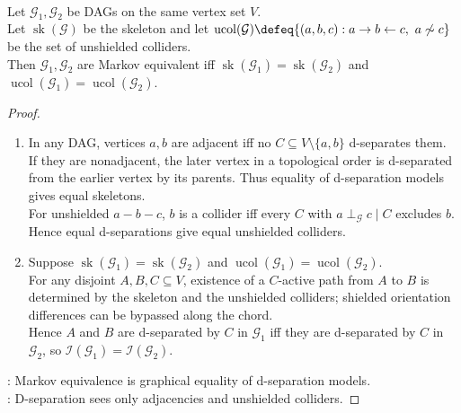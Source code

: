 \begin{theorem} \label{thm:markov-equivalence-skeleton-colliders} \\
Let $\mathcal{G}_1,\mathcal{G}_2$ be DAGs on the same vertex set $V$.\\
Let $\operatorname{sk}(\mathcal{G})$ be the skeleton and let $\operatorname{ucol}(\mathcal{G})\defeq\{(a,b,c):a\to b\leftarrow c,\ a\not\sim c\}$ be the set of unshielded colliders.\\
Then $\mathcal{G}_1,\mathcal{G}_2$ are Markov equivalent iff $\operatorname{sk}(\mathcal{G}_1)=\operatorname{sk}(\mathcal{G}_2)$ and $\operatorname{ucol}(\mathcal{G}_1)=\operatorname{ucol}(\mathcal{G}_2)$.
\begin{proof}
\begin{enumerate}[label=\roman*.]
\setlength{\itemsep}{0pt}
\item[$(\Rightarrow)$] In any DAG, vertices $a,b$ are adjacent iff no $C\subseteq V\setminus\{a,b\}$ d-separates them.\\
If they are nonadjacent, the later vertex in a topological order is d-separated from the earlier vertex by its parents. Thus equality of d-separation models gives equal skeletons.\\
For unshielded $a-b-c$, $b$ is a collider iff every $C$ with $a\perp_{\mathcal{G}}c\mid C$ excludes $b$.\\
Hence equal d-separations give equal unshielded colliders.
\item[$(\Leftarrow)$] Suppose $\operatorname{sk}(\mathcal{G}_1)=\operatorname{sk}(\mathcal{G}_2)$ and $\operatorname{ucol}(\mathcal{G}_1)=\operatorname{ucol}(\mathcal{G}_2)$.\\
For any disjoint $A,B,C\subseteq V$, existence of a $C$-active path from $A$ to $B$ is determined by the skeleton and the unshielded colliders; shielded orientation differences can be bypassed along the chord.\\
Hence $A$ and $B$ are d-separated by $C$ in $\mathcal{G}_1$ iff they are d-separated by $C$ in $\mathcal{G}_2$, so $\mathcal{I}(\mathcal{G}_1)=\mathcal{I}(\mathcal{G}_2)$.
\end{enumerate}
: Markov equivalence is graphical equality of d-separation models.\\
: D-separation sees only adjacencies and unshielded colliders.
\end{proof}
\end{theorem}

